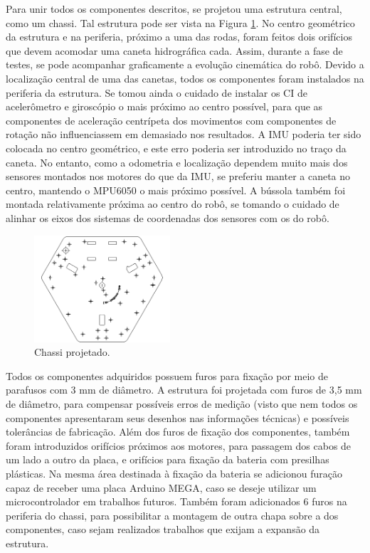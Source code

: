 Para unir todos os componentes descritos, se projetou uma estrutura central, como um chassi. Tal estrutura pode ser vista na Figura \ref{fig:chassi}. No centro geométrico da estrutura e na periferia, próximo a uma das rodas, foram feitos dois orifícios que devem acomodar uma caneta hidrográfica cada. Assim, durante a fase de testes, se pode acompanhar graficamente a evolução cinemática do robô. Devido a localização central de uma das canetas, todos os componentes foram instalados na periferia da estrutura. Se tomou ainda o cuidado de instalar os CI de acelerômetro e giroscópio o mais próximo ao centro possível, para que as componentes de aceleração centrípeta dos movimentos com componentes de rotação não influenciassem em demasiado nos resultados. A IMU poderia ter sido colocada no centro geométrico, e este erro poderia ser introduzido no traço da caneta. No entanto, como a odometria e localização dependem muito mais dos sensores montados nos motores do que da IMU, se preferiu manter a caneta no centro, mantendo o MPU6050 o mais próximo possível. A bússola também foi montada relativamente próxima ao centro do robô, se tomando o cuidado de alinhar os eixos dos sistemas de coordenadas dos sensores com os do robô.

\begin{figure}[h]
  \centering
  \includegraphics[width = 0.45\textwidth]{imagens/chassidxf}
  \caption{Chassi projetado.}
  \label{fig:chassi}
\end{figure}

Todos os componentes adquiridos possuem furos para fixação por meio de parafusos com 3 mm de diâmetro. A estrutura foi projetada com furos de 3,5 mm de diâmetro, para compensar possíveis erros de medição (visto que nem todos os componentes apresentaram seus desenhos nas informações técnicas) e possíveis tolerâncias de fabricação. Além dos furos de fixação dos componentes, também foram introduzidos orifícios próximos aos motores, para passagem dos cabos de um lado a outro da placa, e orifícios para fixação da bateria com presilhas plásticas. Na mesma área destinada à fixação da bateria se adicionou furação capaz de receber uma placa Arduino MEGA, caso se deseje utilizar um microcontrolador em trabalhos futuros. Também foram adicionados 6 furos na periferia do chassi, para possibilitar a montagem de outra chapa sobre a dos componentes, caso sejam realizados trabalhos que exijam a expansão da estrutura.

